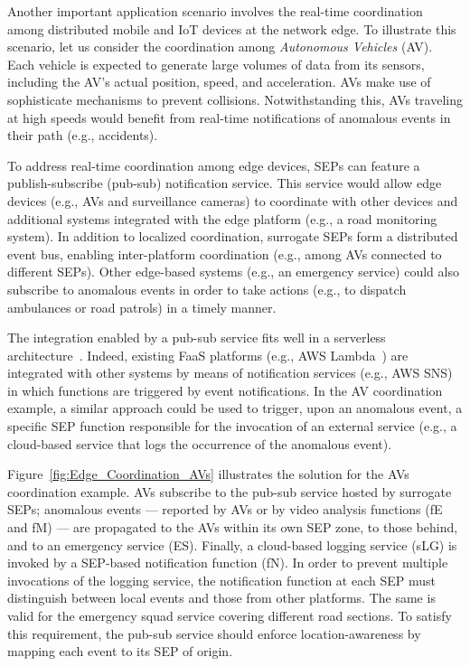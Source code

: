 Another important application scenario involves the real-time coordination among distributed mobile and IoT devices at the network edge. To illustrate this scenario, let us consider the coordination among \textit{Autonomous Vehicles} (AV). Each vehicle is expected to generate large volumes of data from its sensors, including the AV's actual position, speed, and acceleration. AVs make use of sophisticate mechanisms to prevent collisions. Notwithstanding this, AVs traveling at high speeds would benefit from real-time notifications of anomalous events in their path (e.g., accidents). 

To address real-time coordination among edge devices, SEPs can feature a publish-subscribe (pub-sub) notification service. This service would allow edge devices (e.g., AVs and surveillance cameras) to coordinate with other devices and additional systems integrated with the edge platform (e.g., a road monitoring system). In addition to localized coordination, surrogate SEPs form a distributed event bus, enabling inter-platform coordination (e.g., among AVs connected to different SEPs). Other edge-based systems (e.g., an emergency service) could also subscribe to anomalous events in order to take actions (e.g., to dispatch ambulances or road patrols) in a timely manner.

The integration enabled by a pub-sub service fits well in a serverless architecture~\cite{Lloyd18serverless}. Indeed, existing FaaS platforms (e.g., AWS Lambda~\cite{AWSLambda}) are integrated with other systems by means of notification services (e.g., AWS SNS) in which functions are triggered by event notifications. In the AV coordination example, a similar approach could be used to trigger, upon an anomalous event, a specific SEP function responsible for the invocation of an external service (e.g., a cloud-based service that logs the occurrence of the anomalous event). 






Figure~\ref{fig:Edge_Coordination_AVs} illustrates the solution for the AVs coordination example. AVs subscribe to the pub-sub service hosted by surrogate SEPs; anomalous events --- reported by AVs or by video analysis functions (fE and fM) --- are propagated to the AVs within its own SEP zone, to those behind, and to an emergency service (ES). Finally, a cloud-based logging service (sLG) is invoked by a SEP-based notification function (fN). In order to prevent multiple invocations of the logging service, the notification function at each SEP must distinguish between local events and those from other platforms. The same is valid for the emergency squad service covering different road sections. To satisfy this requirement, the pub-sub service should enforce location-awareness by mapping each event to its SEP of origin.

